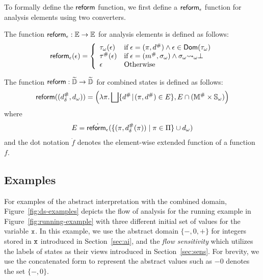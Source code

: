 To formally define the $\triage$ function, we first define a $\atriage$ function
for analysis elements using two converters.
\begin{definition}[$\atriage$]\label{def:atriage}
  The function $\textsf{reform}_\epsilon: \mathbb{E} \rightarrow \mathbb{E}$ for analysis elements
  is defined as follows:
  \[
    \textsf{reform}_\epsilon(\epsilon) = \left\{
      \begin{array}{ll}
        {\tau}_\omega(\epsilon)
        & \text{if} \; \epsilon = (\pi, {d}^{\#}) \wedge \epsilon \in
        \textsf{Dom}({\tau}_\omega)\\
        {\tau}^{\#}(\epsilon)
        & \text{if} \; \epsilon = ({m}^{\#}, {\sigma}_\omega) \wedge {\sigma}_\omega {\leadsto}_\omega
        \bot\\
        \epsilon
        & \text{Otherwise}
      \end{array}
    \right.
  \]
\end{definition}
\begin{definition}[$\triage$]\label{def:triage}
  The \triagename function $\textsf{reform}: \widetilde{\mathbb{D}} \rightarrow \widetilde{\mathbb{D}}$ for combined
  states is defined as follows:
  \[
    \textsf{reform}(({{d}^{\#}_\delta}, {d}_\omega)) = \left(
      \lambda \pi. \bigsqcup \{ {d}^{\#} \!\mid\! (\pi, {d}^{\#}) \in E \},
      E \cap ({\mathbb{M}}^{\#} \times {\mathbb{S}}_\omega)
    \right)
  \]
  where
  \[
    E = \dot{\textsf{reform}_\epsilon}(\{ (\pi, {{d}^{\#}_\delta}(\pi)) \mid \pi \in \Pi \} \cup {d}_\omega)
  \]
and the dot notation $\dot{f}$ denotes the element-wise extended function of a
function $f$.
\end{definition}


\subsection{Examples}

For examples of the abstract interpretation with the combined domain,
Figure~\ref{fig:ds-examples} depicts the flow of analysis for the running
example in Figure~\ref{fig:running-example} with three different initial set of
values for the variable $\texttt{x}$.  In this example, we use the abstract domain
$\{ -, 0, + \}$ for integers stored in $\texttt{x}$ introduced in
Section~\ref{sec:ai}, and the \textit{flow sensitivity} which utilizes the
labels of states as their views introduced in Section~\ref{sec:sens}.  For
brevity, we use the concatenated form to represent the abstract values such as
$-0$ denotes the set $\{ -, 0 \}$.

